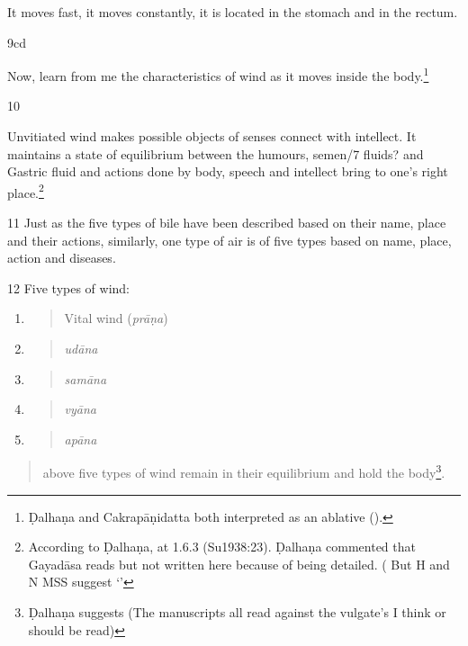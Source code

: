 \begin{translation}
It moves fast, it moves constantly, it is located in the stomach and
in the rectum.

\item[9cd] 

Now, learn from me the characteristics of wind as it moves inside the
body.\footnote{Ḍalhaṇa and Cakrapāṇidatta both interpreted  as an 
ablative ().}

\item[10] 

Unvitiated wind makes possible objects of senses connect with
intellect. It maintains a state of equilibrium between the humours,
semen/7 fluids? and Gastric fluid and actions done by body, speech and
intellect bring to one's right place.\footnote{ According to Ḍalhaṇa,
 at 1.6.3 (Su1938:23). Ḍalhaṇa commented that
Gayadāsa reads  but not written here
because of being detailed. ( But H and N MSS suggest  
`'}

\item[11] Just as the five types of bile have been described based 
on their
name, place and their actions, similarly, one type of air is of five
types based on name, place, action and diseases.

\item[12] Five types of wind:

\begin{enumerate}
\def\labelenumi{\arabic{enumi}.}
\item
\begin{quote}
Vital wind (\emph{prāṇa})
\end{quote}
\item
\begin{quote}
\emph{udāna }
\end{quote}
\item
\begin{quote}
\emph{samāna}
\end{quote}
\item
\begin{quote}
\emph{vyāna}
\end{quote}
\item
\begin{quote}
\emph{apāna}
\end{quote}
\end{enumerate}

\begin{quote}
above five types of wind remain in their equilibrium and hold the
body\footnote{ Ḍalhaṇa suggests 
(The manuscripts all read    against the vulgate's  I think  or  should be read)}.
\end{quote}


\end{translation}
